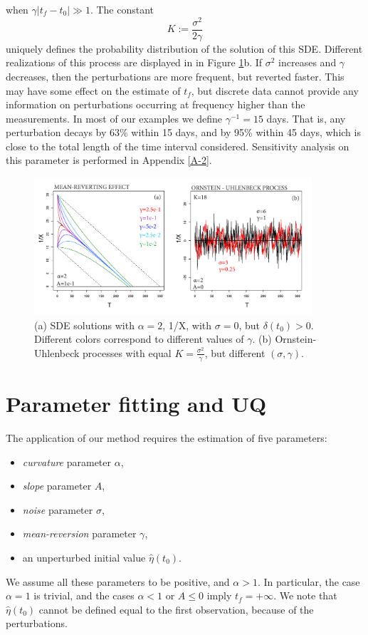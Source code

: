 \documentclass{article}
\begin{document}
when $\gamma|t_f-t_0|\gg1$. The constant
$$K:=\frac{\sigma^2}{2\gamma}$$
uniquely defines the probability distribution of the solution of this SDE. Different realizations of this process are displayed in in Figure \ref{Fig3}b. If $\sigma^2$ increases and $\gamma$ decreases, then the perturbations are more frequent, but reverted faster. This may have some effect on the estimate of $t_f$, but discrete data cannot provide any information on perturbations occurring at frequency higher than the measurements. In most of our examples we define $\gamma^{-1}=15$ days. That is, any perturbation decays by 63\% within 15 days, and by 95\% within 45 days, which is close to the total length of the time interval considered. Sensitivity analysis on this parameter is performed in Appendix \ref{A-2}.

\begin{figure}[H]
\centering
\includegraphics[width=0.92\textwidth]{Fig3_plus.png}
\caption{(a) SDE solutions with $\alpha=2$, 1/X, with $\sigma=0$, but $\delta(t_0)>0$. Different colors correspond to different values of $\gamma$. (b) Ornstein-Uhlenbeck processes with equal $K=\frac{\sigma^2}{\gamma}$, but different $(\sigma, \gamma)$.}
\label{Fig3}
\end{figure}

\section{Parameter fitting and UQ}\label{s4}
The application of our method requires the estimation of five parameters:
\begin{itemize}
  \item {\it curvature} parameter $\alpha$,
  \item {\it slope} parameter $A$,
  \item {\it noise} parameter $\sigma$,
  \item {\it mean-reversion} parameter $\gamma$,
  \item an unperturbed initial value $\hat\eta(t_0)$.
\end{itemize}
We assume all these parameters to be positive, and $\alpha > 1$. In particular, the case $\alpha=1$ is trivial, and the cases $\alpha <1$ or $A\le0$ imply $t_f=+\infty$. We note that $\hat\eta(t_0)$ cannot be defined equal to the first observation, because of the perturbations.
\end{document}
